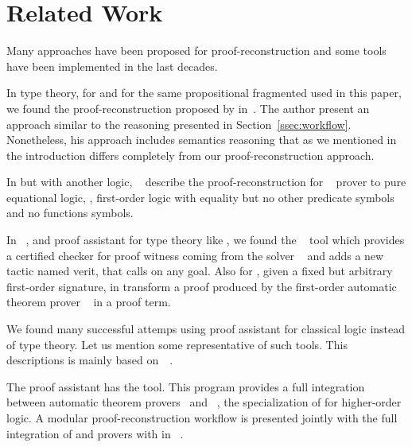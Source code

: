 \documentclass[../main.tex]{subfiles}
\begin{document}

\section{Related Work}
\label{sec:related-work}

Many approaches have been proposed for proof-reconstruction and some tools have been implemented in the last decades.

In type theory, for \Agda and  for the same propositional fragmented used in this paper,
we found the proof-reconstruction proposed by \citeauthor{Kanso2012}
in~\cite{Kanso2012,kanso2016light}. The author present an approach similar to
the reasoning presented in Section~\ref{ssec:workflow}.
Nonetheless, his approach includes semantics reasoning that as we mentioned
in the introduction differs completely from our proof-reconstruction approach.

In \Agda but with another logic, \citeauthor{foster2011integrating}~\cite{foster2011integrating}
describe the proof-reconstruction for ~\cite{hillenbrand1997}
prover to pure equational logic, \ie,
first-order logic with equality but no other predicate symbols and no
functions symbols.

In ~\cite{coqteam}, and proof assistant for type theory like \Agda, 
we found the ~\cite{armand2011,Ekici2017} tool which provides a
certified checker for proof witness coming from the \SMT solver
~\cite{bouton2009} and adds a new tactic named verit,
that calls  on any  goal.
Also for , 
given a fixed but arbitrary first-order signature,
\citeauthor{Bezem2002} in \cite{Bezem2002}
transform a proof produced by the first-order automatic theorem
prover ~\cite{deNivelle2003} in a  proof
term.

We found many successful attemps using proof assistant for classical logic
instead of type theory.
Let us mention some representative of such tools. This descriptions is
mainly based on~\citeauthor{Sicard-Ramirez2016}~\cite{Sicard-Ramirez2016}.

The  proof assistant has the  tool.
This program provides a full integration between
automatic theorem provers~\cite{blanchette2013extending,Fleury2014,bohme2010} and
~\cite{nipkow2002isabelle}, the specialization of
 for higher-order logic.
A modular proof-reconstruction workflow is presented jointly with
the full integration of  and  provers with
 in \citeauthor{Een2004}~\cite{Een2004}.
\end{document}
